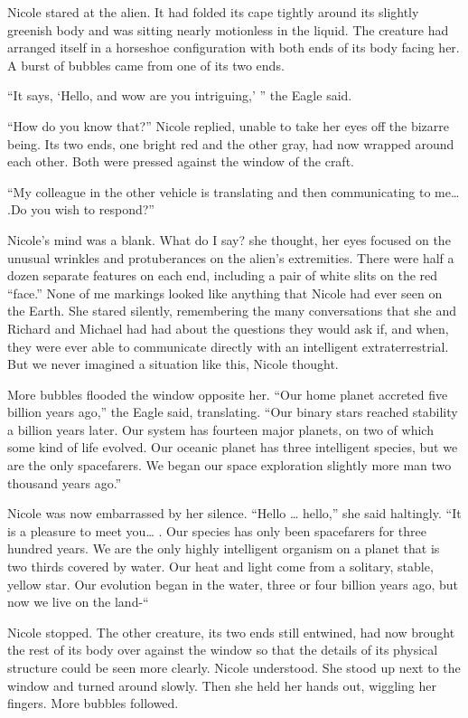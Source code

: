 \documentclass[]{article}
\begin{document}
{Nicole stared at the alien. It had folded its cape tightly around its slightly greenish body and was sitting nearly motionless in the liquid. The creature had arranged itself in a horseshoe configuration with both ends of its body facing her. A burst of bubbles came from one of its two ends.

“It says, ‘Hello, and wow are you intriguing,’ ” the Eagle said.

“How do you know that?” Nicole replied, unable to take her eyes off the bizarre being. Its two ends, one bright red and the other gray, had now wrapped around each other. Both were pressed against the window of the craft.

“My colleague in the other vehicle is translating and then communicating to me… .Do you wish to respond?”

Nicole’s mind was a blank. What do I say? she thought, her eyes focused on the unusual wrinkles and protuberances on the alien’s extremities. There were half a dozen separate features on each end, including a pair of white slits on the red “face.” None of me markings looked like anything that Nicole had ever seen on the Earth. She stared silently, remembering the many conversations that she and Richard and Michael had had about the questions they would ask if, and when, they were ever able to communicate directly with an intelligent extraterrestrial. But we never imagined a situation like this, Nicole thought.

More bubbles flooded the window opposite her. “Our home planet accreted five billion years ago,” the Eagle said, translating. “Our binary stars reached stability a billion years later. Our system has fourteen major planets, on two of which some kind of life evolved. Our oceanic planet has three intelligent species, but we are the only spacefarers. We began our space exploration slightly more man two thousand years ago.”

Nicole was now embarrassed by her silence. “Hello … hello,” she said haltingly. “It is a pleasure to meet you… . Our species has only been spacefarers for three hundred years. We are the only highly intelligent organism on a planet that is two thirds covered by water. Our heat and light come from a solitary, stable, yellow star. Our evolution began in the water, three or four billion years ago, but now we live on the land-“

Nicole stopped. The other creature, its two ends still entwined, had now brought the rest of its body over against the window so that the details of its physical structure could be seen more clearly. Nicole understood. She stood up next to the window and turned around slowly. Then she held her hands out, wiggling her fingers. More bubbles followed.

}
\end{document}
